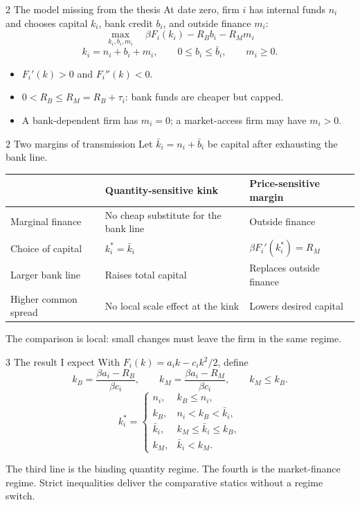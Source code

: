 \documentclass[aspectratio=169,11pt]{beamer}
\newcommand{\Rb}{R_B}
\newcommand{\Rm}{R_M}
\newcommand{\kb}{k_B}
\newcommand{\km}{k_M}
\begin{document}
\begin{frame}{2 \textperiodcentered{} The model missing from the thesis}
At date zero, firm $i$ has internal funds $n_i$ and chooses capital $k_i$,
bank credit $b_i$, and outside finance $m_i$:
\[
 \max_{k_i,b_i,m_i}\quad
 \beta F_i(k_i)-\Rb b_i-\Rm m_i
\]
\[
 k_i=n_i+b_i+m_i,\qquad
 0\leq b_i\leq\bar b_i,\qquad m_i\geq0.
\]

\begin{itemize}
  \item $F_i'(k)>0$ and $F_i''(k)<0$.
  \item $0<\Rb\leq\Rm=\Rb+\tau_i$: bank funds are cheaper but capped.
  \item A bank-dependent firm has $m_i=0$; a market-access firm may have
        $m_i>0$.
\end{itemize}
\end{frame}

\begin{frame}{2 \textperiodcentered{} Two margins of transmission}
Let $\bar k_i=n_i+\bar b_i$ be capital after exhausting the bank line.

\medskip
\begin{center}
\begin{tabular}{p{.24\linewidth}p{.31\linewidth}p{.31\linewidth}}
\toprule
 & \textbf{Quantity-sensitive kink} & \textbf{Price-sensitive margin}\\
\midrule
Marginal finance & No cheap substitute for the bank line & Outside finance\\
Choice of capital & $k_i^*=\bar k_i$ & $\beta F_i'(k_i^*)=\Rm$\\
Larger bank line & Raises total capital & Replaces outside finance\\
Higher common spread & No local scale effect at the kink & Lowers desired capital\\
\bottomrule
\end{tabular}
\end{center}

\medskip
The comparison is local: small changes must leave the firm in the same regime.
\end{frame}

\begin{frame}{3 \textperiodcentered{} The result I expect}
With $F_i(k)=a_i k-c_i k^2/2$, define
\[
 \kb=\frac{\beta a_i-\Rb}{\beta c_i},\qquad
 \km=\frac{\beta a_i-\Rm}{\beta c_i},\qquad \km\leq\kb.
\]
\[
k_i^*=\begin{cases}
n_i, & \kb\leq n_i,\\
\kb, & n_i<\kb<\bar k_i,\\
\bar k_i, & \km\leq\bar k_i\leq\kb,\\
\km, & \bar k_i<\km.
\end{cases}
\]

\small
The third line is the binding quantity regime. The fourth is the
market-finance regime. Strict inequalities deliver the comparative statics
without a regime switch.
\end{frame}
\end{document}
